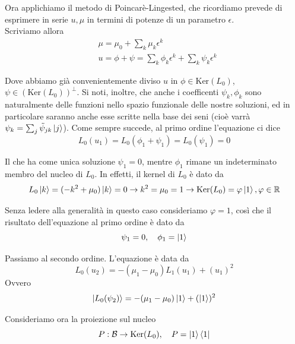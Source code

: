 \documentclass{report}
\begin{document}
{    Ora applichiamo il metodo di Poincarè-Lingested, che ricordiamo prevede di esprimere in serie $u, \mu$ in termini di potenze di un parametro $\epsilon$. \\

    Scriviamo allora 
    \begin{align}
        &\mu = \mu_0 + \sum_k \mu_k\epsilon^k \\
        & u = \phi + \psi = \sum_k \phi_k\epsilon^k + \sum_k\psi_k\epsilon^k
    \end{align}

Dove abbiamo già convenientemente diviso $u$ in $\phi \in \text{Ker}(L_0)$, $\psi \in (\text{Ker}(L_0))^{\perp}$. Si noti, inoltre, che anche i coefficenti $\psi_k, \phi_k$ sono naturalmente delle funzioni nello spazio funzionale delle nostre soluzioni, ed in particolare saranno anche esse scritte nella base dei seni (cioè varrà $\psi_k = \sum_j \tilde{\psi}_{jk}\ket{j}$). Come sempre succede, al primo ordine l'equazione ci dice 
\begin{equation}
    L_0(u_1) = L_0(\phi_1 + \psi_1) = L_0(\psi_1) = 0  
\end{equation}

Il che ha come unica soluzione $\psi_1 = 0$, mentre $\phi_1$ rimane un indeterminato membro del nucleo di $L_0$. In effetti, il kernel di $L_0$ è dato da 
\begin{equation}
    L_0\ket{k} = (-k^2 + \mu_0)\ket{k} = 0 \rightarrow k^2 = \mu_0 = 1 \rightarrow \text{Ker}(L_0) = \varphi \ket{1}, \varphi \in \mathbb{R}
\end{equation}

Senza ledere alla generalità in questo caso consideriamo $\varphi = 1$, così che il risultato dell'equazione al primo ordine è dato da 
\begin{equation}
    \psi_1 = 0, \quad \phi_1 = \ket{1}
\end{equation}

Passiamo al secondo ordine. L'equazione è data da 
\begin{equation}
    L_0(u_2) = -(\mu_1 - \mu_0)L_1(u_1) + (u_1)^2
\end{equation}
Ovvero 
\begin{equation}
    \ket{L_0(\psi_2)} = -(\mu_1-\mu_0)\ket{1} + (\ket{1})^2
\end{equation}

Consideriamo ora la proiezione sul nucleo
\begin{equation}
    P : \mathcal{B} \rightarrow \text{Ker}(L_0), \quad P = \ket{1}\bra{1}
\end{equation}

}
\end{document}
